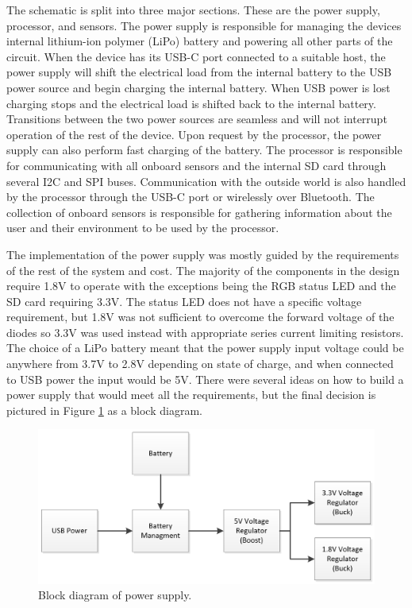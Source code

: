 The schematic is split into three major sections. These are the power supply, 
processor, and sensors. The power supply is responsible for managing the 
devices internal lithium-ion polymer (LiPo) battery and powering all other 
parts of the circuit. When the device has its USB-C port connected to a 
suitable host, the power supply will shift the electrical load from the 
internal battery to the USB power source and begin charging the internal 
battery. When USB power is lost charging stops and the electrical load is 
shifted back to the internal battery. Transitions between the two power 
sources are seamless and will not interrupt operation of the rest of the 
device. Upon request by the processor, the power supply can also perform fast 
charging of the battery. The processor is responsible for communicating with 
all onboard sensors and the internal SD card through several I2C and SPI 
buses. Communication with the outside world is also handled by the processor
through the USB-C port or wirelessly over Bluetooth. The collection of onboard 
sensors is responsible for gathering information about the user and their 
environment to be used by the processor.

The implementation of the power supply was mostly guided by the requirements of 
the rest of the system and cost. The majority of the components in the design 
require 1.8V to operate with the exceptions being the RGB status LED and the SD 
card requiring 3.3V. The status LED does not have a specific voltage 
requirement, but 1.8V was not sufficient to overcome the forward voltage of the 
diodes so 3.3V was used instead with appropriate series current limiting 
resistors. The choice of a LiPo battery meant that the power supply input 
voltage could be anywhere from 3.7V to 2.8V depending on state of charge, and 
when connected to USB power the input would be 5V. There were several ideas on 
how to build a power supply that would meet all the requirements, but the final 
decision is pictured in Figure \ref{fig:BlockDiagram_PowerSupply} as a block 
diagram.

\begin{figure}[!htb]
\centering
\includegraphics[scale=0.4]{images/BlockDiagram_PowerSupply.png}
\caption{Block diagram of power supply.}
\label{fig:BlockDiagram_PowerSupply}
\end{figure}

